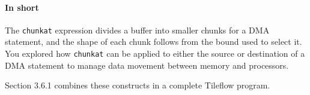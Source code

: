 \paragraph*{In short}

The \texttt{chunkat} expression divides a buffer into smaller chunks for a DMA statement, and the shape of each chunk follows from the bound used to select it. You explored how \texttt{chunkat} can be applied to either the source or destination of a DMA statement to manage data movement between memory and processors.

Section 3.6.1 combines these constructs in a complete Tileflow program.
